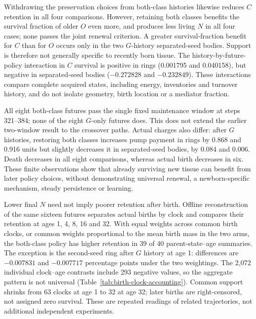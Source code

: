 Withdrawing the preservation choices from both-class histories likewise reduces $C$ retention in all four comparisons. However, retaining both classes benefits the survival fraction of older $O$ even more, and produces less living $N$ in all four cases; none passes the joint renewal criterion. A greater survival-fraction benefit for $C$ than for $O$ occurs only in the two $G$-history separated-seed bodies. Support is therefore not generally specific to recently born tissue. The history-by-future-policy interaction in $C$ survival is positive in rings (0.001795 and 0.040158), but negative in separated-seed bodies ($-0.272828$ and $-0.232849$). These interactions compare complete acquired states, including energy, inventories and turnover history, and do not isolate geometry, birth location or a mediator fraction.

All eight both-class futures pass the single fixed maintenance window at steps 321--384; none of the eight $G$-only futures does. This does not extend the earlier two-window result to the crossover paths. Actual charges also differ: after $G$ histories, restoring both classes increases pump payment in rings by 0.868 and 0.916 units but slightly decreases it in separated-seed bodies, by 0.084 and 0.006. Death decreases in all eight comparisons, whereas actual birth decreases in six. These finite observations show that already surviving new tissue can benefit from later policy choices, without demonstrating universal renewal, a newborn-specific mechanism, steady persistence or learning.



Lower final $N$ need not imply poorer retention after birth. Offline reconstruction of the same sixteen futures separates actual births by clock and compares their retention at ages 1, 4, 8, 16 and 32. With equal weights across common birth clocks, or common weights proportional to the mean birth mass in the two arms, the both-class policy has higher retention in 39 of 40 parent-state--age summaries. The exception is the second-seed ring after $G$ history at age 1: differences are $-0.007831$ and $-0.007717$ percentage points under the two weightings. The 2,072 individual clock--age contrasts include 293 negative values, so the aggregate pattern is not universal (Table~\ref{tab:birth-clock-accounting}). Common support shrinks from 63 clocks at age 1 to 32 at age 32; later births are right-censored, not assigned zero survival. These are repeated readings of related trajectories, not additional independent experiments.

